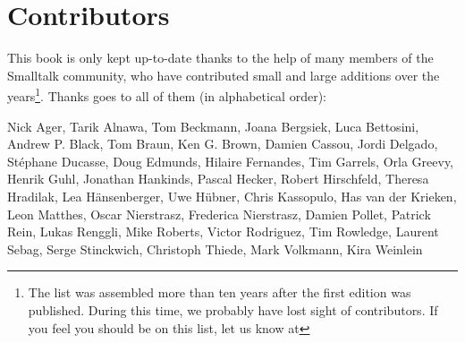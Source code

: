 \chapter*{Contributors}
This book is only kept up-to-date thanks to the help of many members of the Smalltalk community, who have contributed small and large additions over the years\footnote{The list was assembled more than ten years after the first edition was published. During this time, we probably have lost sight of contributors. If you feel you should be on this list, let us know at \sbeRepoUrl}. Thanks goes to all of them (in alphabetical order):

\begin{flushleft}
Nick Ager, Tarik Alnawa, Tom Beckmann, Joana Bergsiek, Luca Bettosini, Andrew P. Black, Tom Braun, Ken G. Brown, Damien Cassou, Jordi Delgado, St\'ephane Ducasse, Doug Edmunds, Hilaire Fernandes, Tim Garrels, Orla Greevy, Henrik Guhl, Jonathan Hankinds, Pascal Hecker, Robert Hirschfeld, Theresa Hradilak, Lea H\"ansenberger, Uwe H\"ubner, Chris Kassopulo, Has van der Krieken, Leon Matthes, Oscar Nierstrasz, Frederica Nierstrasz, Damien Pollet, Patrick Rein, Lukas Renggli, Mike Roberts, Victor Rodriguez, Tim Rowledge, Laurent Sebag, Serge Stinckwich, Christoph Thiede, Mark Volkmann, Kira Weinlein
\end{flushleft}


%
%

